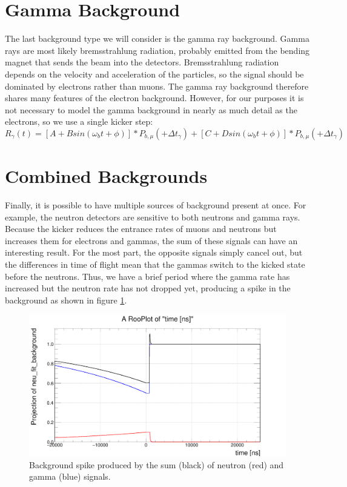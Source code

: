 \section{Gamma Background}

The last background type we will consider is the gamma ray background.
Gamma rays are most likely bremsstrahlung radiation, probably emitted from the bending magnet that sends the beam into the detectors.
Bremsstrahlung radiation depends on the velocity and acceleration of the particles, so the signal should be dominated by electrons rather than muons.
The gamma ray background therefore shares many features of the electron background.
However, for our purposes it is not necessary to model the gamma background in nearly as much detail as the electrons, so we use a single kicker step:
\begin{equation}
R_{\gamma}(t) = [A + B sin(\omega_b t + \phi)] * P_{b,\mu}(+\Delta t_{\gamma}) + [C + D sin(\omega_b t + \phi)] * P_{b,\mu}(+\Delta t_{\gamma})
\end{equation}

\section{Combined Backgrounds}

Finally, it is possible to have multiple sources of background present at once.
For example, the neutron detectors are sensitive to both neutrons and gamma rays.
Because the kicker reduces the entrance rates of muons and neutrons but increases them for electrons and gammas, the sum of these signals can have an interesting result.
For the most part, the opposite signals simply cancel out, but the differences in time of flight mean that the gammas switch to the kicked state before the neutrons.
Thus, we have a brief period where the gamma rate has increased but the neutron rate has not dropped yet, producing a spike in the background as shown in figure \ref{fig:finger}.

\begin{figure}[h]
  \includegraphics[width=\textwidth]{beam/figures/Finger_Model.png}
  \caption{Background spike produced by the sum (black) of neutron (red) and gamma (blue) signals. }
  \label{fig:finger}
\end{figure}

